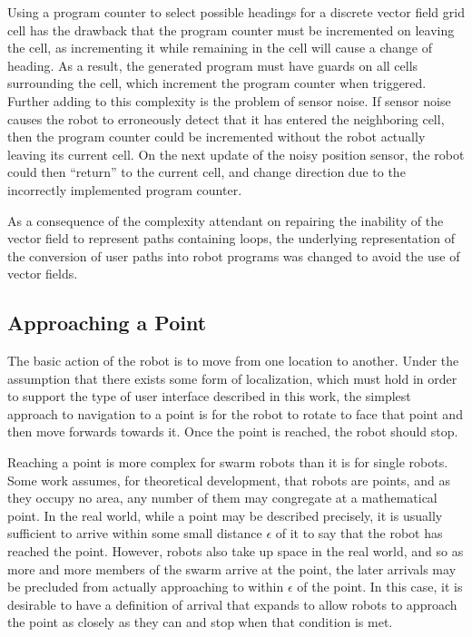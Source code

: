 Using a program counter to select possible headings for a discrete vector field grid cell has the drawback that the program counter must be incremented on leaving the cell, as incrementing it while remaining in the cell will cause a change of heading.
As a result, the generated program must have guards on all cells surrounding the cell, which increment the program counter when triggered. 
Further adding to this complexity is the problem of sensor noise. 
If sensor noise causes the robot to erroneously detect that it has entered the neighboring cell, then the program counter could be incremented without the robot actually leaving its current cell. 
On the next update of the noisy position sensor, the robot could then ``return'' to the current cell, and change direction due to the incorrectly implemented program counter. 

As a consequence of the complexity attendant on repairing the inability of the vector field to represent paths containing loops, the underlying representation of the conversion of user paths into robot programs was changed to avoid the use of vector fields. 

\subsection{Approaching a Point}

The basic action of the robot is to move from one location to another. 
Under the assumption that there exists some form of localization, which must hold in order to support the type of user interface described in this work, the simplest approach to navigation to a point is for the robot to rotate to face that point and then move forwards towards it. Once the point is reached, the robot should stop. 

Reaching a point is more complex for swarm robots than it is for single robots. 
Some work assumes, for theoretical development, that robots are points, and as they occupy no area, any number of them may congregate at a mathematical point. 
In the real world, while a point may be described precisely, it is usually sufficient to arrive within some small distance $\epsilon$ of it to say that the robot has reached the point. 
However, robots also take up space in the real world, and so as more and more members of the swarm arrive at the point, the later arrivals may be precluded from actually approaching to within $\epsilon$ of the point.
In this case, it is desirable to have a definition of arrival that expands to allow robots to approach the point as closely as they can and stop when that condition is met. 

